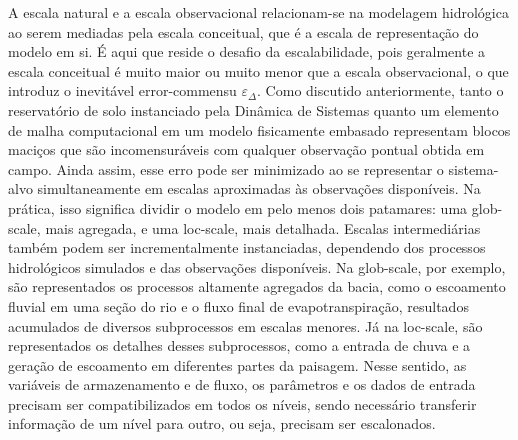 \documentclass[./main.tex]{subfiles}
\begin{document}
\par A escala natural e a escala observacional relacionam-se na modelagem hidrológica ao serem mediadas pela escala conceitual, que é a escala de representação do modelo em si. É aqui que reside o desafio da escalabilidade, pois geralmente a escala conceitual é muito maior ou muito menor que a escala observacional, o que introduz o inevitável \gls{error-commensu} $\varepsilon_{\Delta}$. Como discutido anteriormente, tanto o reservatório de solo instanciado pela Dinâmica de Sistemas quanto um elemento de malha computacional em um modelo fisicamente embasado representam blocos maciços que são incomensuráveis com qualquer observação pontual obtida em campo. Ainda assim, esse erro pode ser minimizado ao se representar o sistema-alvo simultaneamente em escalas aproximadas às observações disponíveis. Na prática, isso significa dividir o modelo em pelo menos dois patamares: uma \gls{glob-scale}, mais agregada, e uma \gls{loc-scale}, mais detalhada. Escalas intermediárias também podem ser incrementalmente instanciadas, dependendo dos processos hidrológicos simulados e das observações disponíveis. Na \gls{glob-scale}, por exemplo, são representados os processos altamente agregados da bacia, como o escoamento fluvial em uma seção do rio e o fluxo final de evapotranspiração, resultados acumulados de diversos subprocessos em escalas menores. Já na \gls{loc-scale}, são representados os detalhes desses subprocessos, como a entrada de chuva e a geração de escoamento em diferentes partes da paisagem. Nesse sentido, as variáveis de armazenamento e de fluxo, os parâmetros e os dados de entrada precisam ser compatibilizados em todos os níveis, sendo necessário transferir informação de um nível para outro, ou seja, precisam ser escalonados. 
\end{document}
